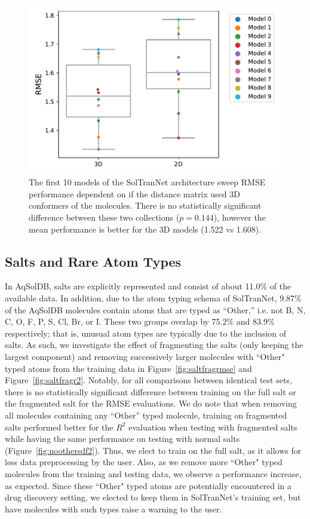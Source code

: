 \documentclass[journal=jmcmar,manuscript=article]{achemso}
\begin{document}
\begin{figure}[tb]
    \centering
    \includegraphics[width=\linewidth]{figures/2dv3d_rmse.pdf}
    \caption{The first 10 models of the SolTranNet architecture sweep RMSE performance dependent on if the distance matrix used 3D conformers of the molecules. There is no statistically significant difference between these two collections ($p=0.144$), however the mean performance is better for the 3D models (1.522 vs 1.608).}
    \label{fig:2dv3drmse}
\end{figure}

\subsection{Salts and Rare Atom Types}
In AqSolDB, salts are explicitly represented and consist of about 11.0\% of the available data.
In addition, due to the atom typing schema of SolTranNet, 9.87\% of the AqSolDB molecules contain atoms that are typed as ``Other,'' i.e. not B, N, C, O, F, P, S, Cl, Br, or I.
These two groups overlap by 75.2\% and 83.9\% respectively; that is, unusual atom types are typically due to the inclusion of salts.
As such, we investigate the effect of fragmenting the salts (only keeping the largest component) and removing successively larger molecules with ``Other" typed atoms from the training data in Figure~\ref{fig:saltfragrmse} and Figure~\ref{fig:saltfragr2}.
Notably, for all comparisons between identical test sets, there is no statistically significant difference between training on the full salt or the fragmented salt for the RMSE evaluations.
We do note that when removing all molecules containing any ``Other'' typed molecule, training on fragmented salts performed better for the $R^2$ evaluation when testing with fragmented salts while having the same performance on testing with normal salts (Figure~\ref{fig:noothersdf2}).
Thus, we elect to train on the full salt, as it allows for less data preprocessing by the user.
Also, as we remove more ``Other" typed molecules from the training and testing data, we observe a performance increase, as expected.
Since these ``Other" typed atoms are potentially encountered in a drug discovery setting, we elected to keep them in SolTranNet's training set, but have molecules with such types raise a warning to the user.
\end{document}
